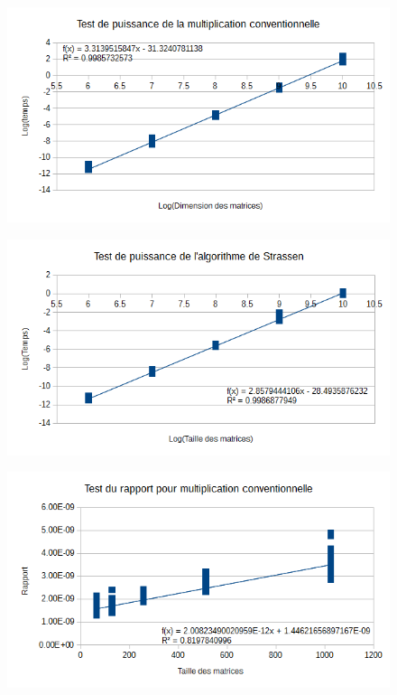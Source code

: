 \documentclass[a4paper, 12pt]{article} %
\begin{document}
\begin{figure}[H]
\centering
\includegraphics{Image/PuissanceConventionnelle.png}
\end{figure}

\begin{figure}[H]
\centering
\includegraphics{Image/PuissanceStrassen.png}
\end{figure}

\begin{figure}[H]
\centering
\includegraphics{Image/RapportConventionnelle.png}
\end{figure}
\end{document}
